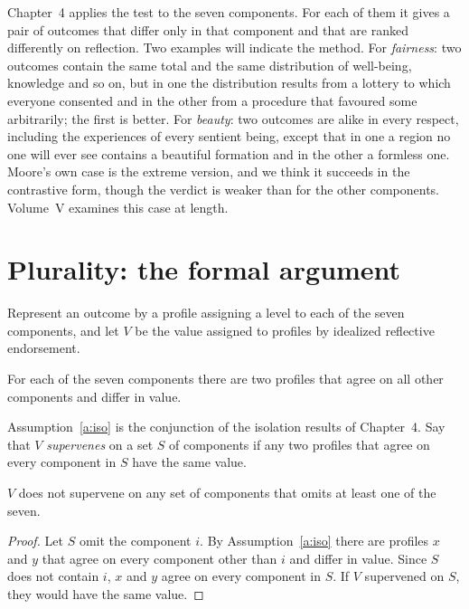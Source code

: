 \documentclass{situationist-preprint}
\begin{document}
Chapter~4 applies the test to the seven components. For each of them it gives a pair of outcomes that differ only in that component and that are ranked differently on reflection. Two examples will indicate the method. For \emph{fairness}: two outcomes contain the same total and the same distribution of well-being, knowledge and so on, but in one the distribution results from a lottery to which everyone consented and in the other from a procedure that favoured some arbitrarily; the first is better. For \emph{beauty}: two outcomes are alike in every respect, including the experiences of every sentient being, except that in one a region no one will ever see contains a beautiful formation and in the other a formless one. Moore's own case \citep[\S 50]{Moore1903} is the extreme version, and we think it succeeds in the contrastive form, though the verdict is weaker than for the other components. Volume~V examines this case at length.

\section{Plurality: the formal argument}

Represent an outcome by a profile assigning a level to each of the seven components, and let $V$ be the value assigned to profiles by idealized reflective endorsement.

\begin{assumption}\label{a:iso}
For each of the seven components there are two profiles that agree on all other components and differ in value.
\end{assumption}

Assumption~\ref{a:iso} is the conjunction of the isolation results of Chapter~4. Say that $V$ \emph{supervenes} on a set $S$ of components if any two profiles that agree on every component in $S$ have the same value.

\begin{theorem}\label{t:plural}
$V$ does not supervene on any set of components that omits at least one of the seven.
\end{theorem}

\begin{proof}
Let $S$ omit the component $i$. By Assumption~\ref{a:iso} there are profiles $x$ and $y$ that agree on every component other than $i$ and differ in value. Since $S$ does not contain $i$, $x$ and $y$ agree on every component in $S$. If $V$ supervened on $S$, they would have the same value.
\end{proof}
\end{document}
